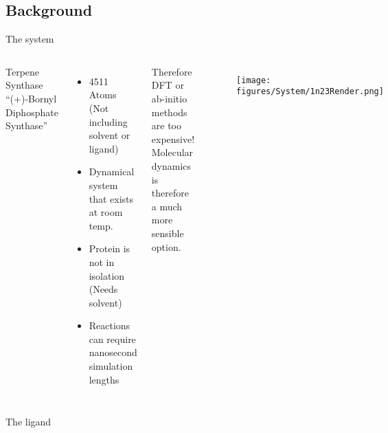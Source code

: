 \subsection{Background}
\begin{frame}{The system}
\begin{columns}
Terpene Synthase \enquote{(+)-Bornyl Diphosphate Synthase}
\begin{itemize}
	\item 4511 Atoms (Not including solvent or ligand)
	\item Dynamical system that exists at room temp.
	\item Protein is not in isolation (Needs solvent)
	\item Reactions can require nanosecond simulation lengths
\end{itemize}
\vspace{1cm}
Therefore DFT or ab-initio methods are too expensive!
Molecular dynamics is therefore a much more sensible option.
\begin{figure}
\texttt{[image: figures/System/1n23Render.png]}
\end{figure}

\end{columns}
\end{frame}


\begin{frame}{The ligand}

\end{frame}

